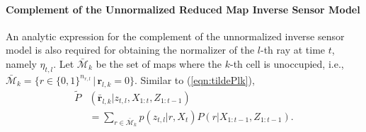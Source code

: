 \documentclass[letterpaper, 10pt, conference]{ieeeconf}
\newcommand{\refeqn}[1]{(\ref{eqn:#1})}
\begin{document}
\begin{appendix}

\paragraph{Complement of the Unnormalized Reduced Map Inverse Sensor Model}
An analytic expression for the complement of the unnormalized inverse sensor model is also required  for obtaining the normalizer of the $l$-th ray at time $t$, namely $\eta_{t,l}$. Let $\bar{\mathcal{M}}_k$ be the set of maps where the $k$-th cell is unoccupied, i.e., $\bar{\mathcal{M}}_k = \{ r\in\{0,1\}^{n_{r,l}}\,|\, \mathbf{r}_{l,k}=0\}$. Similar to \refeqn{tildePlk},
\begin{align}
\tilde P&(\bar{\mathbf{r}}_{l,k}|z_{t,l},X_{1:t},Z_{1:t-1})\nonumber\\
& = \sum_{r\in\bar{\mathcal{M}}_{k}} p(z_{t,l}|r,X_t) P(r|X_{1:t-1},Z_{1:t-1}).\label{eqn:tildePbarlk}
\end{align}


\end{appendix}
\end{document}
